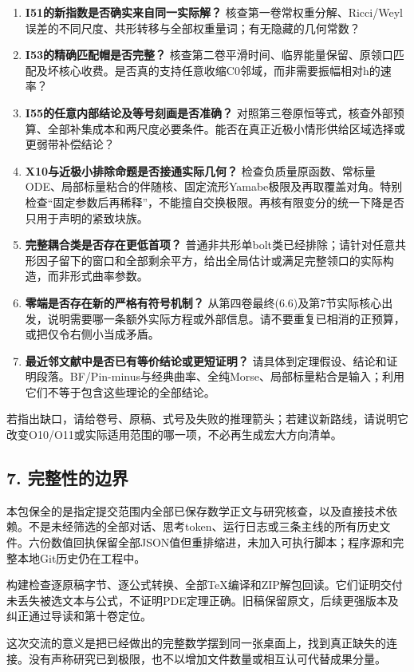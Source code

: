 \documentclass[
  10pt,
]{article}
\providecommand{\tightlist}{%
  \setlength{\itemsep}{0pt}\setlength{\parskip}{0pt}}
\begin{document}
\begin{enumerate}
\def\labelenumi{\arabic{enumi}.}
\tightlist
\item
  \textbf{I51的新指数是否确实来自同一实际解？}
  核查第一卷常权重分解、Ricci/Weyl误差的不同尺度、共形转移与全部权重量词；有无隐藏的几何常数？
\item
  \textbf{I53的精确匹配帽是否完整？}
  核查第二卷平滑时间、临界能量保留、原领口匹配及坏核心收费。是否真的支持任意收缩C0邻域，而非需要振幅相对h的速率？
\item
  \textbf{I55的任意内部结论及等号刻画是否准确？}
  对照第三卷原恒等式，核查外部预算、全部补集成本和两尺度必要条件。能否在真正近极小情形供给区域选择或更弱带补偿结论？
\item
  \textbf{X10与近极小排除命题是否接通实际几何？}
  检查负质量原函数、常标量ODE、局部标量粘合的伴随核、固定流形Yamabe极限及再取覆盖对角。特别检查``固定参数后再稀释''，不能擅自交换极限。再核有限变分的统一下降是否只用于声明的紧致块族。
\item
  \textbf{完整耦合类是否存在更低首项？}
  普通非共形单bolt类已经排除；请针对任意共形因子留下的窗口和全部剩余平方，给出全局估计或满足完整领口的实际构造，而非形式曲率参数。
\item
  \textbf{零端是否存在新的严格有符号机制？}
  从第四卷最终(6.6)及第7节实际核心出发，说明需要哪一条额外实际方程或外部信息。请不要重复已相消的正预算，或把仅令右侧小当成矛盾。
\item
  \textbf{最近邻文献中是否已有等价结论或更短证明？}
  请具体到定理假设、结论和证明段落。BF/Pin-minus与经典曲率、全纯Morse、局部标量粘合是输入；利用它们不等于包含这些理论的全部结论。
\end{enumerate}

若指出缺口，请给卷号、原稿、式号及失败的推理箭头；若建议新路线，请说明它改变O10/O11或实际适用范围的哪一项，不必再生成宏大方向清单。

\hypertarget{ux5b8cux6574ux6027ux7684ux8fb9ux754c}{%
\subsection{7.
完整性的边界}\label{ux5b8cux6574ux6027ux7684ux8fb9ux754c}}

本包保全的是指定提交范围内全部已保存数学正文与研究核查，以及直接技术依赖。不是未经筛选的全部对话、思考token、运行日志或三条主线的所有历史文件。六份数值回执保留全部JSON值但重排缩进，未加入可执行脚本；程序源和完整本地Git历史仍在工程中。

构建检查逐原稿字节、逐公式转换、全部TeX编译和ZIP解包回读。它们证明交付未丢失被选文本与公式，不证明PDE定理正确。旧稿保留原文，后续更强版本及纠正通过导读和第十卷定位。

这次交流的意义是把已经做出的完整数学摆到同一张桌面上，找到真正缺失的连接。没有声称研究已到极限，也不以增加文件数量或相互认可代替成果分量。
\end{document}
